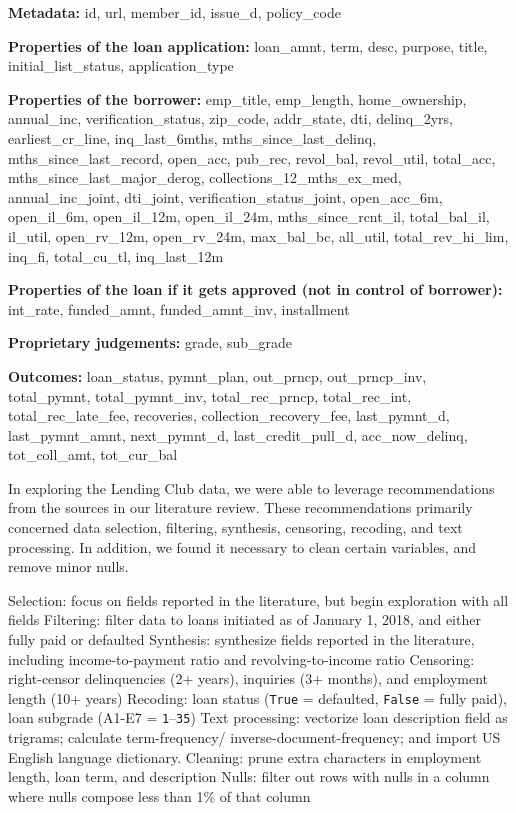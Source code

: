 {\tt\raggedright\hyphenchar{}
{\bf Metadata:}
 id,
 url,
 member\_id,
 issue\_d,
 policy\_code

{\bf Properties of the loan application:}
 loan\_amnt,
 term,
 desc,
 purpose,
 title,
 initial\_list\_status,
 application\_type

{\bf Properties of the borrower:}
 emp\_title,
 emp\_length,
 home\_ownership,
 annual\_inc,
 verification\_status,
 zip\_code,
 addr\_state,
 dti,
 delinq\_2yrs,
 earliest\_cr\_line,
 inq\_last\_6mths,
 mths\_since\_last\_delinq,
 mths\_since\_last\_record,
 open\_acc,
 pub\_rec,
 revol\_bal,
 revol\_util,
 total\_acc,
 mths\_since\_last\_major\_derog,
 collections\_12\_mths\_ex\_med,
 annual\_inc\_joint,
 dti\_joint,
 verification\_status\_joint,
 open\_acc\_6m,
 open\_il\_6m,
 open\_il\_12m,
 open\_il\_24m,
 mths\_since\_rcnt\_il,
 total\_bal\_il,
 il\_util,
 open\_rv\_12m,
 open\_rv\_24m,
 max\_bal\_bc,
 all\_util,
 total\_rev\_hi\_lim,
 inq\_fi,
 total\_cu\_tl,
 inq\_last\_12m

{\bf Properties of the loan if it gets approved (not in control of borrower):}
 int\_rate,
 funded\_amnt,
 funded\_amnt\_inv,
 installment


{\bf Proprietary judgements:}
 grade,  sub\_grade


{\bf Outcomes:}
 loan\_status,
 pymnt\_plan,
 out\_prncp,
 out\_prncp\_inv,
 total\_pymnt,
 total\_pymnt\_inv,
 total\_rec\_prncp,
 total\_rec\_int,
 total\_rec\_late\_fee,
 recoveries,
 collection\_recovery\_fee,
 last\_pymnt\_d,
 last\_pymnt\_amnt,
 next\_pymnt\_d,
 last\_credit\_pull\_d,
 acc\_now\_delinq,
 tot\_coll\_amt,
 tot\_cur\_bal

}

In exploring the Lending Club data, we were able to leverage
recommendations from the sources in our literature review. These
recommendations primarily concerned data selection, filtering,
synthesis, censoring, recoding, and text processing. In addition, we
found it necessary to clean certain variables, and remove minor nulls.

\* Selection: focus on fields reported in the literature, but begin exploration with all fields
\* Filtering: filter data to loans initiated as of January 1, 2018, and either fully paid or defaulted
\* Synthesis: synthesize fields reported in the literature, including income-to-payment ratio and revolving-to-income ratio
\* Censoring: right-censor delinquencies (2+ years), inquiries (3+ months), and employment length (10+ years)
\* Recoding: loan status ({\tt True} = defaulted, {\tt False} = fully paid), loan subgrade (A1-E7 = {\tt 1}--{\tt 35})
\* Text processing: vectorize loan description field as trigrams; calculate term-frequency/ inverse-document-frequency; and import US English language dictionary.
\* Cleaning: prune extra characters in employment length, loan term, and description
\* Nulls: filter out rows with nulls in a column where nulls compose less than 1\% of that column

